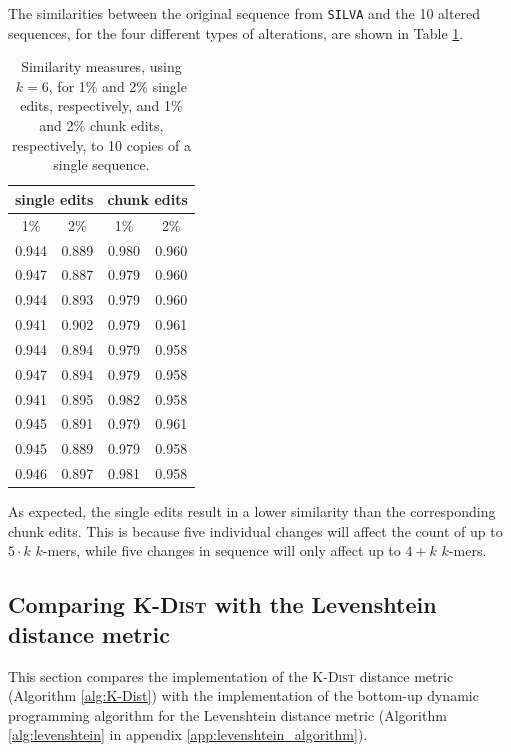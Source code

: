 The similarities between the original sequence from \texttt{SILVA} and the 10
altered sequences, for the four different types of alterations, are shown in
Table \ref{tab:altered_seqs_similarities}.

\begin{table}[H]
  \centering
  \begin{tabular}{c|c||c|c}
    \multicolumn{2}{c||}{single edits}  & \multicolumn{2}{c}{chunk edits} \\
    \hline\hline
    1\%   &   2\%                   &   1\%   &   2\% \\
    \hline
    0.944   & 0.889                     & 0.980     & 0.960 \\
    0.947   & 0.887                     & 0.979     & 0.960 \\
    0.944   & 0.893                     & 0.979     & 0.960 \\
    0.941   & 0.902                     & 0.979     & 0.961 \\
    0.944   & 0.894                     & 0.979     & 0.958 \\
    0.947   & 0.894                     & 0.979     & 0.958 \\
    0.941   & 0.895                     & 0.982     & 0.958 \\
    0.945   & 0.891                     & 0.979     & 0.961 \\
    0.945   & 0.889                     & 0.979     & 0.958 \\
    0.946   & 0.897                     & 0.981     & 0.958
  \end{tabular}
  \caption{Similarity measures, using $k=6$, for 1\% and 2\% single edits,
    respectively, and 1\% and 2\% chunk edits, respectively, to 10 copies of a
    single sequence.}
  \label{tab:altered_seqs_similarities}
\end{table}

As expected, the single edits result in a lower similarity than the
corresponding chunk edits. This is because five individual changes will affect
the count of up to $5 \cdot k$ $k$-mers, while five changes in sequence will
only affect up to $4+k$ $k$-mers.


\subsection{Comparing \textsc{K-Dist} with the Levenshtein distance metric}
\label{sec:kdist_vs_levenshtein}

This section compares the implementation of the \textsc{K-Dist} distance metric
(Algorithm \ref{alg:K-Dist}) with the implementation of the bottom-up dynamic
programming algorithm  for the Levenshtein distance metric (Algorithm
\ref{alg:levenshtein} in appendix \ref{app:levenshtein_algorithm}).

